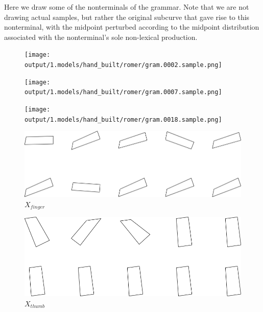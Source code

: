 Here we draw some of the nonterminals of the grammar. Note that we are
not drawing actual samples, but rather the original subcurve that gave
rise to this nonterminal, with the midpoint perturbed according to the
midpoint distribution associated with the nonterminal's sole non-lexical
production.

\begin{figure}
\texttt{[image: output/1.models/hand\_built/romer/gram.0002.sample.png]}
\end{figure}

\begin{figure}
\texttt{[image: output/1.models/hand\_built/romer/gram.0007.sample.png]}
\end{figure}

\begin{figure}
\texttt{[image: output/1.models/hand\_built/romer/gram.0018.sample.png]}
\end{figure}


\begin{figure}
\includegraphics[width=\linewidth]{output/1.models/hand_built/hand/gram.0008.sample.png}
\caption{$X_{finger}$}
\end{figure}

\begin{figure}
\includegraphics[width=\linewidth]{output/1.models/hand_built/hand/gram.0009.sample.png}
\caption{$X_{thumb}$}
\end{figure}

\FloatBarrier


